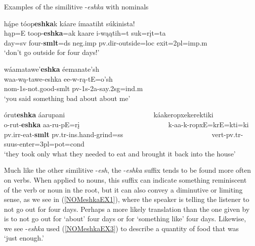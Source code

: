 \begin{exe}

\item\label{NOMeshkaEX} Examples of the similitive -\textit{eshka} with nominals

    \begin{xlist}
    
    \item\label{NOMeshkaEX1} \glll hą́pe tóop\textbf{eshka}k káare ímaatiht súkinista!\\
    hąp=E toop-\textbf{eshka}=ak kaare i-wąątih=t suk=rįt=ta\\
    \textnormal{day}=sv \textnormal{four}-\textbf{smlt}=ds neg.imp pv.dir-\textnormal{outside}=loc \textnormal{exit}=2pl=imp.m\\
    \glt `don't go outside for four days!' \citep[199]{hollow1973a}
    
    \item\label{NOMeshkaEX2} \glll wáamatawe'\textbf{eshka} éemanate'sh\\
    waa-wą-tawe-eshka ee-w-rą-tE=o'sh\\
    nom-1s-\textnormal{not.good}-smlt pv-1s-2a-\textnormal{say}.2sg=ind.m\\
    \glt `you said something bad about about me' \citep[88]{hollow1973b}
    
    \item\label{NOMeshkaEX3} \glll órut\textbf{eshka} áarupani ~ ~ ~ ~ ~ ~ ~ ~ ~ ~ ~ ~ ~ ~ ~  káakeropxekerektiki\\
    o-rut-\textbf{eshka} aa-ru-pE=rį ~ ~ ~ ~ ~ ~ ~ ~ ~ ~ ~ ~ ~ ~ ~  k-aa-k-ropxE=krE=kti=ki\\
    pv.irr-\textnormal{eat}-\textbf{smlt} pv.tr-ins.hand-\textnormal{grind}=ss ~ ~ ~ ~ ~ ~ ~ ~ ~ ~ ~ ~ ~ ~ ~  vert-pv.tr-suus-\textnormal{enter}=3pl=pot=cond\\
    \glt `they took only what they needed to eat and brought it back into the house' \citep[19]{trechter2012}
    
    \end{xlist}

\end{exe}

Much like the other similitive -\textit{esh}, the -\textit{eshka} suffix tends to be found more often on verbs. When applied to nouns, this suffix can indicate something reminiscent of the verb or noun in the root, but it can also convey a diminutive or limiting sense, as we see in (\ref{NOMeshkaEX1}), where the speaker is telling the listener to not go out for four days. Perhaps a more likely translation than the one given by \citeauthor{hollow1970} is to not go out for `about' four days or for `something like' four days. Likewise, we see -\textit{eshka} used (\ref{NOMeshkaEX3}) to describe a quantity of food that was `just enough.' 

